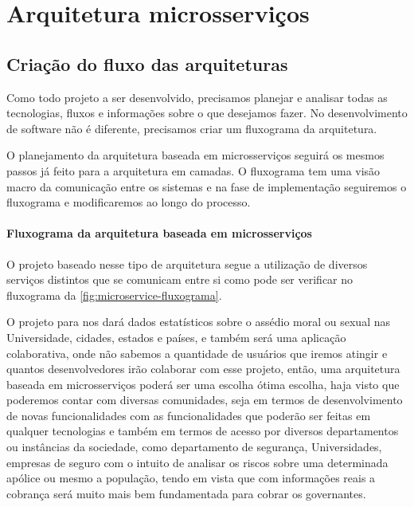 
\chapter{Arquitetura microsserviços}\label{cap5}

\section{Criação do fluxo das arquiteturas}

Como todo projeto a ser desenvolvido, precisamos planejar e analisar todas as tecnologias, fluxos e informações sobre o que desejamos fazer. No desenvolvimento de software não é diferente, precisamos criar um fluxograma da arquitetura.

O planejamento da arquitetura baseada em microsserviços seguirá os mesmos passos já feito para a arquitetura em camadas. O fluxograma tem uma visão macro da comunicação entre os sistemas e na fase de implementação seguiremos o fluxograma e modificaremos ao longo do processo.

\subsubsection{Fluxograma da arquitetura baseada em microsserviços}

O projeto baseado nesse tipo de arquitetura segue a utilização de diversos serviços distintos que se comunicam entre si como pode ser verificar no fluxograma da \ref{fig:microservice-fluxograma}.

O projeto para nos dará dados estatísticos sobre o assédio moral ou sexual nas Universidade, cidades, estados e países, e também será uma aplicação colaborativa, onde não sabemos a quantidade de usuários que iremos atingir e quantos desenvolvedores irão colaborar com esse projeto, então, uma arquitetura baseada em microsserviços poderá ser uma escolha ótima escolha, haja visto que poderemos contar com diversas comunidades, seja em termos de desenvolvimento de novas funcionalidades com as funcionalidades que poderão ser feitas em qualquer tecnologias e também em termos de acesso por diversos departamentos ou instâncias da sociedade, como departamento de segurança, Universidades, empresas de seguro com o intuito de analisar os riscos sobre uma determinada apólice ou mesmo a população, tendo em vista que com informações reais a cobrança será muito mais bem fundamentada para cobrar os governantes. 

